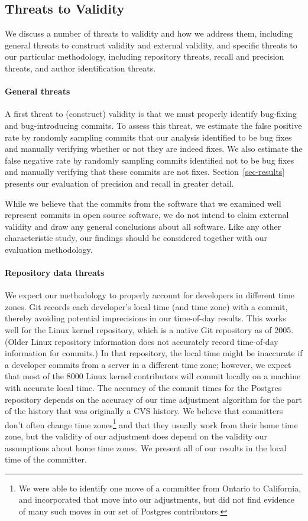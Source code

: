 \subsection{Threats to Validity}
We discuss a number of threats to validity and how we address them,
including general threats to construct validity and external validity,
and specific threats to our particular methodology, including 
repository threats, recall and precision threats, 
and author identification threats.

\paragraph{General threats}
A first threat to (construct) validity is that we must properly
identify bug-fixing and bug-introducing commits. To assess this
threat, we estimate the false positive rate by randomly sampling
commits that our analysis identified to be bug fixes and manually
verifying whether or not they are indeed fixes.  We also estimate the
false negative rate by randomly sampling commits identified not to be
bug fixes and manually verifying that these commits are not fixes.
Section~\ref{sec-results} presents our evaluation of precision and recall 
in greater detail.

While we believe that the commits from the software that we examined
well represent commits in open source software, we do not intend to
claim external validity and draw any general conclusions about all
software.  Like any other characteristic study, our findings should be
considered together with our evaluation methodology.

\paragraph{Repository data threats}
We expect our methodology to properly account for developers in
different time zones. Git records each developer's local time (and
time zone) with a commit, thereby avoiding potential imprecisions in
our time-of-day results. This works well for the Linux kernel repository,
which is a native Git repository as of 2005. (Older Linux repository
information does not accurately record time-of-day information for
commits.) In that repository, the
local time might be inaccurate if a developer commits from a server in
a different time zone; however, we expect that most of the 8000 Linux kernel
contributors will commit locally on a machine with accurate local
time.  The accuracy of the commit times for the Postgres repository
depends on the accuracy of our time adjustment algorithm for the part
of the history that was originally a CVS history. We believe that
committers don't often change time zones\footnote{We were able to identify
one move of a committer from Ontario to California, and incorporated that
move into our adjustments, but did not find evidence of many such moves
in our set of Postgres contributors.} and that they usually work from their
home time zone, but the validity of our adjustment does depend on the
validity our assumptions about home time zones. We present all of our
results in the local time of the committer.

